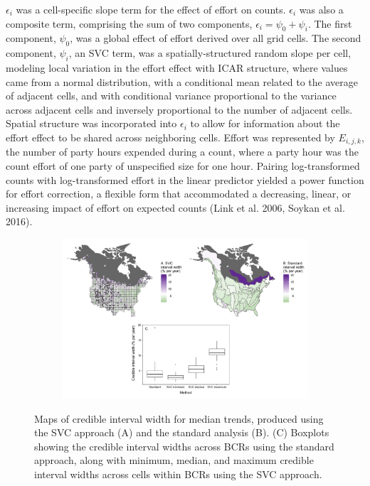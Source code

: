 \documentclass[]{article}
\begin{document}
$\epsilon_i$ was a cell-specific slope term for the effect of effort on counts. $\epsilon_i$ was also a composite term, comprising the sum of two components, $\epsilon_i = \psi_0 + \psi_i$. The first component, $\psi_0$, was a global effect of effort derived over all grid cells. The second component, $\psi_i$, an SVC term, was a spatially-structured random slope per cell, modeling local variation in the effort effect with ICAR structure, where values came from a normal distribution, with a conditional mean related to the average of adjacent cells, and with conditional variance proportional to the variance across adjacent cells and inversely proportional to the number of adjacent cells. Spatial structure was incorporated into $\epsilon_i$ to allow for information about the effort effect to be shared across neighboring cells. Effort was represented by $E_{i,j,k}$, the number of party hours expended during a count, where a party hour was the count effort of one party of unspecified size for one hour. Pairing log-transformed counts with log-transformed effort in the linear predictor yielded a power function for effort correction, a flexible form that accommodated a decreasing, linear, or increasing impact of effort on expected counts (Link et al. 2006, Soykan et al. 2016).

\begin{figure}[t]
  \centering
  \begin{subfigure}[t]{0.99\textwidth}
    \centering
    \includegraphics[width=\textwidth]{prec_bcr} 
  \end{subfigure}
  \caption{Maps of credible interval width for median trends, produced using the SVC approach (A) and the standard analysis (B). (C) Boxplots showing the credible interval widths across BCRs using the standard approach, along with minimum, median, and maximum credible interval widths across cells within BCRs using the SVC approach.}
\end{figure}
\end{document}
